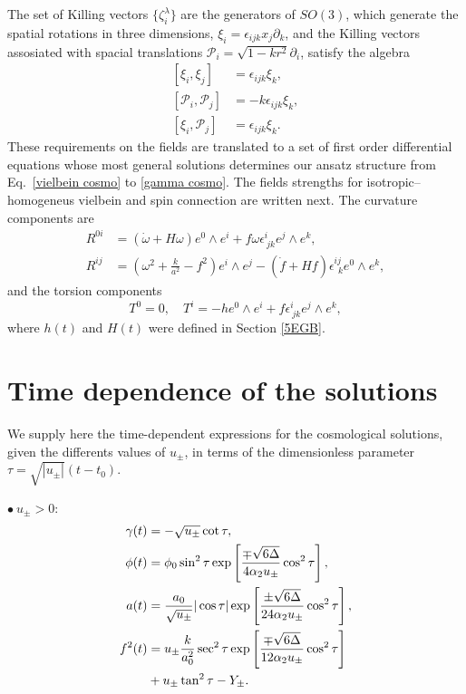 \documentclass[aps,prd,12pt,superscriptaddress,showpacs,showkeys,longbibliography,reprint,nofootinbib]{revtex4-1}
\begin{document}
The set of Killing vectors $\{\zeta^\lambda_i\}$ are the generators of $SO(3)$, which generate the spatial rotations in three dimensions, $\xi_i=\epsilon_{ijk}x_j\partial_k$, and the Killing vectors assosiated with spacial translations $\mathcal{P}_i=\sqrt{1-kr^2}\partial_i$, satisfy the algebra
\begin{align}
  \left[\xi_i,\xi_j\right]&=\epsilon_{ijk}\xi_k,\\
  \left[\mathcal{P}_i,\mathcal{P}_j\right]&=-k\epsilon_{ijk}\xi_k,\\
  \left[\xi_i,\mathcal{P}_j\right]&=\epsilon_{ijk}\xi_k.
\end{align}
These requirements on the fields are translated to a set of first order differential equations whose most general solutions determines our ansatz structure from Eq.~\eqref{vielbein cosmo} to \eqref{gamma cosmo}. The fields strengths for isotropic--homogeneus vielbein and spin connection are written next. The curvature components are
\begin{align}
  R^{0i}&=\left(\dot{\omega}+H\omega\right)e^0\wedge e^i+f\omega\epsilon^i_{\ jk}e^j\wedge e^k,\\
  R^{ij}&=\left(\omega^2+\frac{k}{a^2}-f^2\right)e^i\wedge e^j
  -\left(\dot{f}+Hf\right)\epsilon^{ij}_{\ \ k}e^0\wedge e^k,
\end{align}
and the torsion components
\begin{equation}\label{homotorsion}
  T^0=0,\quad T^i=-he^0\wedge e^i+f\epsilon^i_{\ jk}e^j\wedge e^k,
\end{equation}
where $h(t)$ and $H(t)$ were defined in Section \ref{5EGB}.

\section{Time dependence of the solutions\label{solutions t}}

We supply here the time-dependent expressions for the cosmological solutions, given the differents values of $u_\pm$, in terms of the dimensionless parameter~$\tau=\sqrt{|u_\pm|}(t-t_0)$.
\medskip

$\bullet\ u_\pm>0$:
\begin{align}
  \gamma(t)&=-\sqrt{u_\pm}\cot\tau,\\
  \phi(t)&=\phi_0\sin^2\tau\exp\left[\frac{\mp\sqrt{6\Delta}}{4\alpha_2 u_\pm}\cos^2\tau\right],\\
  a(t)&=\frac{a_0}{\sqrt{u_\pm}}|\cos\tau|\exp\left[\frac{\pm\sqrt{6\Delta}}{24\alpha_2 u_\pm}\cos^2\tau\right],\\
  f^2(t)&=u_\pm\frac{k}{a_0^2}\sec^2\tau\exp\left[\frac{\mp\sqrt{6\Delta}}{12\alpha_2u_\pm}\cos^2\tau\right]\notag\\
  &+u_\pm\tan^2\tau-Y_\pm.
\end{align}
\end{document}
